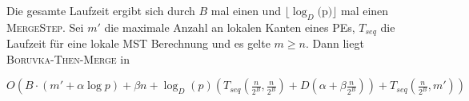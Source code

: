 Die gesamte Laufzeit ergibt sich durch $B$ mal einen \boruvkaStep \space und $\lfloor \log_{D}($p$) \rfloor$ mal einen \textsc{MergeStep}. 
Sei $m'$ die maximale Anzahl an lokalen Kanten eines PEs, $T_{seq}$ die Laufzeit für eine lokale MST Berechnung und es gelte $m \geq n$.
Dann liegt \textsc{Boruvka-Then-Merge} in 
\begin{center}
$O(B \cdot (m' + \alpha \log p) + \beta n
+ \log_{D}(p)  (T_{seq}(\frac{n}{2^B},\frac{n}{2^B}) + D(\alpha + \beta \frac{n}{2^B}))
+ T_{seq}(\frac{n}{2^B},m')
)$
\end{center}
